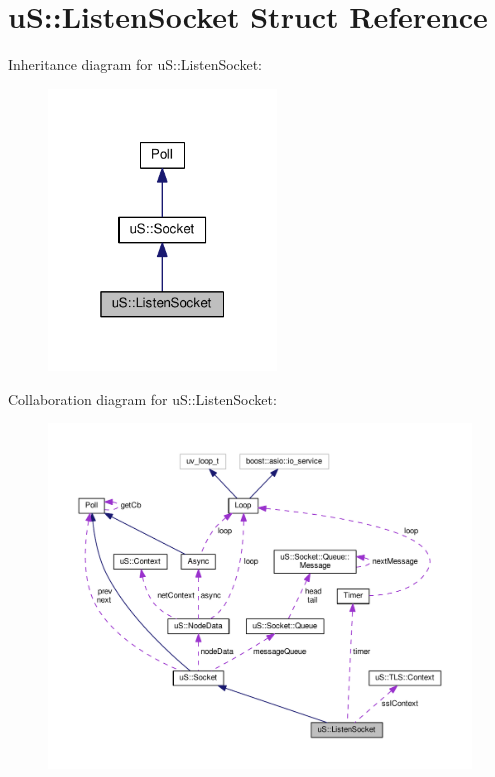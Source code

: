 \hypertarget{structu_s_1_1_listen_socket}{}\section{uS\+:\+:Listen\+Socket Struct Reference}
\label{structu_s_1_1_listen_socket}


Inheritance diagram for uS\+:\+:Listen\+Socket\+:
\nopagebreak
\begin{figure}[H]
\begin{center}
\leavevmode
\includegraphics[width=172pt]{structu_s_1_1_listen_socket__inherit__graph}
\end{center}
\end{figure}


Collaboration diagram for uS\+:\+:Listen\+Socket\+:
\nopagebreak
\begin{figure}[H]
\begin{center}
\leavevmode
\includegraphics[width=350pt]{structu_s_1_1_listen_socket__coll__graph}
\end{center}
\end{figure}

